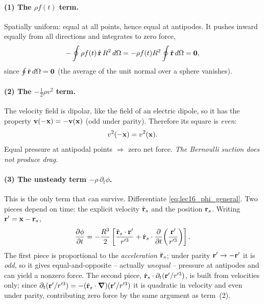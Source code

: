 \documentclass[../main.tex]{subfiles}
\begin{document}
\paragraph{(1) The $\rho f(t)$ term.}
Spatially uniform: equal at all points, hence equal at antipodes. It pushes inward equally from all directions and integrates to zero force,
\begin{equation}
  -\oint \rho f(t)\,\hat{\mathbf{r}}\,R^2\,d\Omega = -\rho f(t)R^2\oint\hat{\mathbf{r}}\,d\Omega = \mathbf{0},
  \label{eq:lec16_ft_zero}
\end{equation}
since $\oint\hat{\mathbf{r}}\,d\Omega=\mathbf{0}$ (the average of the unit normal over a sphere vanishes).

\paragraph{(2) The $-\tfrac{1}{2}\rho v^2$ term.}
The velocity field is dipolar, like the field of an electric dipole, so it has the property $\mathbf{v}(-\mathbf{x})=-\mathbf{v}(\mathbf{x})$ (odd under parity). Therefore its square is \emph{even}:
\begin{equation}
  v^2(-\mathbf{x}) = v^2(\mathbf{x}).
  \label{eq:lec16_vsq_even}
\end{equation}
Equal pressure at antipodal points $\Rightarrow$ zero net force. \emph{The Bernoulli suction does not produce drag.}

\paragraph{(3) The unsteady term $-\rho\,\partial_t\phi$.}
This is the only term that can survive. Differentiate \eqref{eq:lec16_phi_general}. Two pieces depend on time: the explicit velocity $\dot{\mathbf{r}}_s$ and the position $\mathbf{r}_s$. Writing $\mathbf{r}'=\mathbf{x}-\mathbf{r}_s$,
\begin{equation}
  \pdv{\phi}{t} = -\frac{R^3}{2}\left[\frac{\ddot{\mathbf{r}}_s\cdot\mathbf{r}'}{r'^3}
  + \dot{\mathbf{r}}_s\cdot\pdv{t}\!\left(\frac{\mathbf{r}'}{r'^3}\right)\right].
  \label{eq:lec16_dtphi}
\end{equation}
The first piece is proportional to the \emph{acceleration} $\ddot{\mathbf{r}}_s$; under parity $\mathbf{r}'\to-\mathbf{r}'$ it is \emph{odd}, so it gives equal-and-opposite -- actually \emph{unequal} -- pressure at antipodes and can yield a nonzero force. The second piece, $\dot{\mathbf{r}}_s\cdot\partial_t(\mathbf{r}'/r'^3)$, is built from velocities only; since $\partial_t(\mathbf{r}'/r'^3)=-(\dot{\mathbf{r}}_s\cdot\grad)(\mathbf{r}'/r'^3)$ it is quadratic in velocity and even under parity, contributing zero force by the same argument as term~(2).
\end{document}
